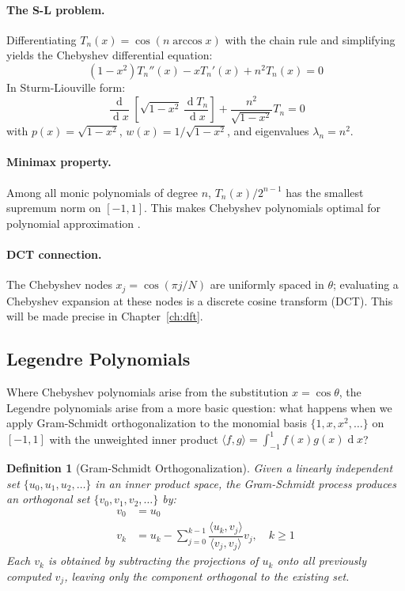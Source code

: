 \documentclass[12pt,a4paper]{report}
\DeclareMathOperator{\deriv}{d}
\theoremstyle{thms}
\theoremstyle{defns}
\newtheorem{definition}{Definition}[section]
\begin{document}
\paragraph{The S-L problem.} Differentiating $T_n(x) = \cos(n\arccos x)$ with the chain rule and simplifying yields the Chebyshev differential equation:
\begin{equation}
    (1-x^2)T_n''(x) - xT_n'(x) + n^2 T_n(x) = 0
\end{equation}
In Sturm-Liouville form:
\begin{equation}
    \dfrac{\deriv}{\deriv x}\left[\sqrt{1-x^2}\,\dfrac{\deriv T_n}{\deriv x}\right] + \dfrac{n^2}{\sqrt{1-x^2}}T_n = 0
\end{equation}
with $p(x) = \sqrt{1-x^2}$, $w(x) = 1/\sqrt{1-x^2}$, and eigenvalues $\lambda_n = n^2$.

\paragraph{Minimax property.} Among all monic polynomials of degree $n$, $T_n(x)/2^{n-1}$ has the smallest supremum norm on $[-1, 1]$. This makes Chebyshev polynomials optimal for polynomial approximation \cite{trefethen_atap}.

\paragraph{DCT connection.} The Chebyshev nodes $x_j = \cos(\pi j/N)$ are uniformly spaced in $\theta$; evaluating a Chebyshev expansion at these nodes is a discrete cosine transform (DCT). This will be made precise in Chapter~\ref{ch:dft}.

\subsection{Legendre Polynomials}

Where Chebyshev polynomials arise from the substitution $x = \cos\theta$, the Legendre polynomials arise from a more basic question: what happens when we apply Gram-Schmidt orthogonalization to the monomial basis $\{1, x, x^2, \ldots\}$ on $[-1, 1]$ with the unweighted inner product $\langle f, g \rangle = \int_{-1}^{1} f(x)g(x)\deriv{x}$?

\begin{definition}[Gram-Schmidt Orthogonalization]
    Given a linearly independent set $\{u_0, u_1, u_2, \ldots\}$ in an inner product space, the Gram-Schmidt process produces an orthogonal set $\{v_0, v_1, v_2, \ldots\}$ by:
    \begin{align}
        v_0 &= u_0 \\
        v_k &= u_k - \sum_{j=0}^{k-1} \dfrac{\langle u_k, v_j \rangle}{\langle v_j, v_j \rangle} v_j, \quad k \geq 1
    \end{align}
    Each $v_k$ is obtained by subtracting the projections of $u_k$ onto all previously computed $v_j$, leaving only the component orthogonal to the existing set.
\end{definition}
\end{document}
